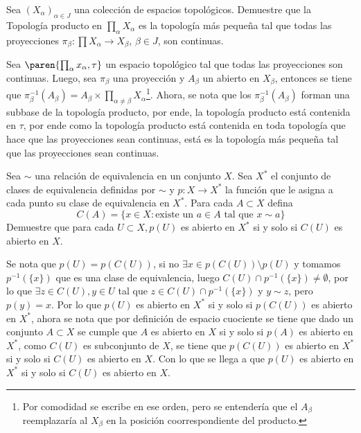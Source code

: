 \documentclass{homework}
\begin{document}
\begin{prob}
    Sea \((X_\alpha)_{\alpha\in J}\) una  colección de espacios topológicos. Demuestre que la Topología producto en \(\prod_\alpha X_\alpha\) es la topología más pequeña tal que todas las proyecciones \(\pi_\beta:\prod X_\alpha\rightarrow X_\beta\), \(\beta\in J\), son continuas.
\end{prob}

\begin{sol}
    Sea \(\paren{\prod_\alpha x_\alpha,\tau}\) un espacio topológico tal que todas las proyecciones son continuas. Luego, sea \(\pi_\beta\) una proyección y \(A_\beta\) un abierto en \(X_\beta\), entonces se tiene que \(\pi_\beta^{-1}(A_\beta)=A_\beta\times\prod_{\alpha\neq\beta}X_\alpha\)\footnote{Por comodidad se escribe en ese orden, pero se entendería que el \(A_\beta\) reemplazaría al \(X_\beta\) en la posición coorrespondiente del producto.}. Ahora, se nota que los \(\pi_\beta^{-1}(A_\beta)\) forman una subbase de la topología producto, por ende, la topología producto está contenida en \(\tau\), por ende como la topología producto está contenida en toda topología que hace que las proyecciones sean continuas, está es la topología más pequeña tal que las proyecciones sean continuas.
\end{sol}


\begin{prob}
    Sea \(\sim\) una relación de equivalencia en un conjunto \(X\). Sea \(X^*\) el conjunto de clases de equivalencia definidas por \(\sim\) y \(p:X\rightarrow X^*\) la función que le asigna a cada punto su clase  de equivalencia en \(X^*\). Para cada \(A\subset X\) defina
    \begin{equation*}
        C(A)=\{x\in X:\text{existe un }a\in A\text{ tal que }x\sim a\}
    \end{equation*}
    Demuestre que para cada \(U\subset X,p(U)\) es abierto en \(X^*\) si y solo si \(C(U)\) es abierto en \(X\).
\end{prob}

\begin{sol}
    Se nota que \(p(U)=p(C(U))\), si no \(\exists x\in p(C(U))\setminus p(U)\) y tomamos \(p^{-1}(\{x\})\) que es una clase de equivalencia, luego \(C(U)\cap p^{-1}(\{x\})\neq\emptyset\), por lo que \(\exists  z\in C(U),y\in U\) tal que \(z\in C(U)\cap p^{-1}(\{x\})\) y \(y\sim z\), pero \(p(y)=x\). Por lo que \(p(U)\) es abierto en \(X^*\) si y solo si \(p(C(U))\) es abierto en \(X^*\), ahora se nota que por definición de espacio cuociente se tiene que dado un conjunto \(A\subset X\) se cumple que \(A\) es abierto en \(X\) si y solo si \(p(A)\) es abierto en \(X^*\), como \(C(U)\) es subconjunto de \(X\), se tiene que \(p(C(U))\) es abierto en \(X^*\) si y solo si \(C(U)\) es abierto en \(X\). Con lo que se llega a que \(p(U)\) es abierto en \(X^*\) si y solo si \(C(U)\) es abierto en \(X\).
\end{sol}
\end{document}
